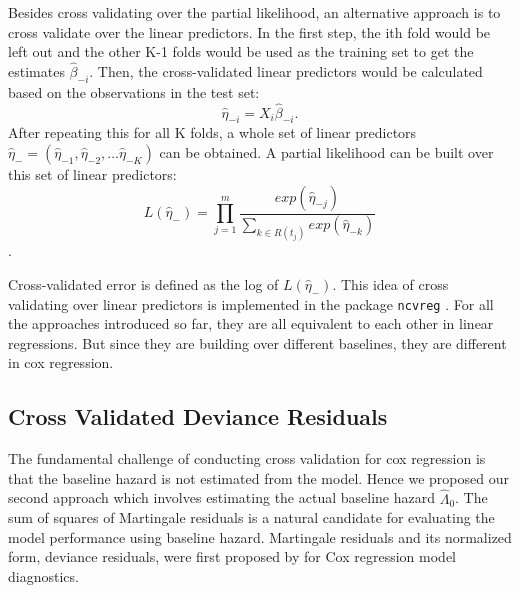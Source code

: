 Besides cross validating over the partial likelihood, an alternative approach is to cross validate over the linear predictors. In the first step, the ith fold would be left out and the other K-1 folds would be used as the training set to get the estimates $\hat{\beta}_{-i}$. Then, the cross-validated linear predictors would be calculated based on the observations in the test set:  \begin{equation}\hat{\eta}_{-i} = X_{i}\hat{\beta}_{-i}.\end{equation} After repeating this for all K folds, a whole set of linear predictors  $\hat{\eta}_{-} = ( \hat{\eta}_{-1},  \hat{\eta}_{-2} , ...  \hat{\eta}_{-K})$ can be obtained. A partial likelihood can be built over this set of linear predictors: \begin{equation} L(\hat{\eta}_{-}) = \prod_{j=1}^{m} \frac{exp (\hat{\eta}_{-j})}{\sum_{ k \in R(t_{j})}exp (\hat{\eta}_{-k})}\end{equation}.

Cross-validated error is defined as the log of $L(\hat{\eta}_{-})$. This idea of cross validating over linear predictors is implemented in the package \texttt{ncvreg} \citep{ncvreg}. For all the approaches introduced so far, they are all equivalent to each other in linear regressions. But since they are building over different baselines, they are different in cox regression.

    
  \subsection{Cross Validated Deviance Residuals}
The fundamental challenge of conducting cross validation for cox regression is that the baseline hazard is not estimated from the model. Hence we proposed our second approach which involves estimating the actual baseline hazard $\hat{\Lambda}_{0}$. The sum of squares of Martingale residuals is a natural candidate for evaluating the model performance using baseline hazard. Martingale residuals and its normalized form, deviance residuals, were first proposed by \citep{Therneau1990} for Cox regression model diagnostics. 

